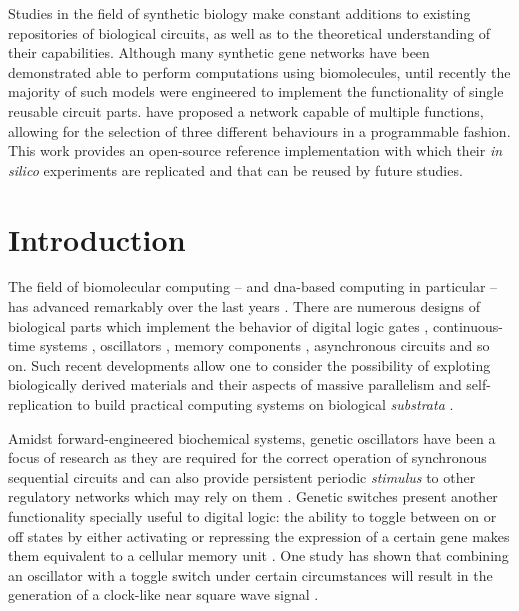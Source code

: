 
  \noindent Studies in the field of synthetic biology make constant additions to existing repositories of biological circuits, as well as to the theoretical understanding of their capabilities.
  Although many synthetic gene networks have been demonstrated able to perform computations using biomolecules, until recently the majority of such models were engineered to implement the functionality of single reusable circuit parts.
  \citet{multif} have proposed a network capable of multiple functions, allowing for the selection of three different behaviours in a programmable fashion.
  This work provides an open-source reference implementation with which their \textit{in silico} experiments are replicated and that can be reused by future studies. %


\section{Introduction}

  The field of biomolecular computing -- and \acs{dna}-based computing in particular -- has advanced remarkably over the last years \cite{history}.
  There are numerous designs of biological parts which implement the behavior of digital logic gates \cite{reconfgate}, continuous-time systems \cite{analog}, oscillators \cite{repressilator}, memory components \cite{register}, asynchronous circuits \cite{async} and so on.
  Such recent developments allow one to consider the possibility of exploting biologically derived materials and their aspects of massive parallelism and self-replication to build practical computing systems on biological \textit{substrata} \cite{youtuber}.

  Amidst forward-engineered biochemical systems, genetic oscillators have been a focus of research \cite{optoscillator} as they are required for the correct operation of synchronous sequential circuits and can also provide persistent periodic \textit{stimulus} to other regulatory networks which may rely on them \cite{bioapps}.
  Genetic switches present another functionality specially useful \cite{bioapps} to digital logic: the ability to toggle between on or off states by either activating or repressing the expression of a certain gene makes them equivalent to a cellular memory unit \cite{youtuber}.
  One study has shown that combining an oscillator with a toggle switch under certain circumstances will result in the generation of a clock-like near square wave signal \cite{clock}.

